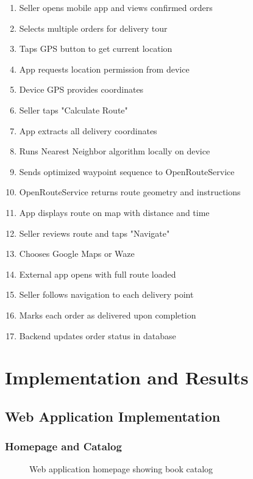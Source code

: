 \documentclass[12pt,a4paper]{article}
\begin{document}
\begin{enumerate}
    \item Seller opens mobile app and views confirmed orders
    \item Selects multiple orders for delivery tour
    \item Taps GPS button to get current location
    \item App requests location permission from device
    \item Device GPS provides coordinates
    \item Seller taps "Calculate Route"
    \item App extracts all delivery coordinates
    \item Runs Nearest Neighbor algorithm locally on device
    \item Sends optimized waypoint sequence to OpenRouteService
    \item OpenRouteService returns route geometry and instructions
    \item App displays route on map with distance and time
    \item Seller reviews route and taps "Navigate"
    \item Chooses Google Maps or Waze
    \item External app opens with full route loaded
    \item Seller follows navigation to each delivery point
    \item Marks each order as delivered upon completion
    \item Backend updates order status in database
\end{enumerate}

\newpage

\section{Implementation and Results}

\subsection{Web Application Implementation}

\subsubsection{Homepage and Catalog}

\begin{figure}[h]
    \centering
    \caption{Web application homepage showing book catalog}
\end{figure}
\end{document}
